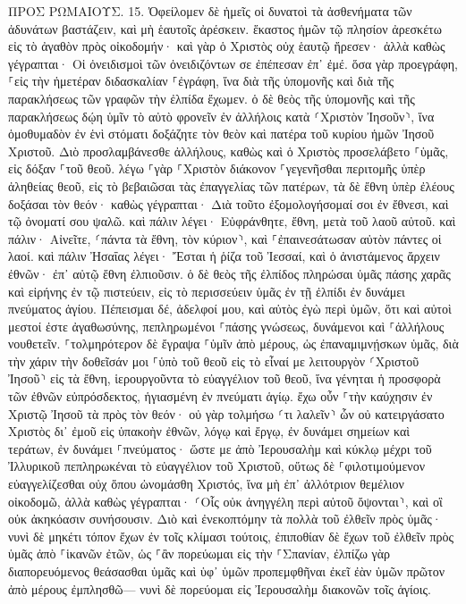 \documentclass[twoside, 9pt]{extreport}
\begin{document}
ΠΡΟΣ ΡΩΜΑΙΟΥΣ.
15.
Ὀφείλομεν δὲ ἡμεῖς οἱ δυνατοὶ τὰ ἀσθενήματα τῶν ἀδυνάτων βαστάζειν, καὶ μὴ ἑαυτοῖς ἀρέσκειν. 
ἕκαστος ἡμῶν τῷ πλησίον ἀρεσκέτω εἰς τὸ ἀγαθὸν πρὸς οἰκοδομήν· 
καὶ γὰρ ὁ Χριστὸς οὐχ ἑαυτῷ ἤρεσεν· ἀλλὰ καθὼς γέγραπται· Οἱ ὀνειδισμοὶ τῶν ὀνειδιζόντων σε ἐπέπεσαν ἐπ᾽ ἐμέ. 
ὅσα γὰρ προεγράφη, ⸀εἰς τὴν ἡμετέραν διδασκαλίαν ⸀ἐγράφη, ἵνα διὰ τῆς ὑπομονῆς καὶ διὰ τῆς παρακλήσεως τῶν γραφῶν τὴν ἐλπίδα ἔχωμεν. 
ὁ δὲ θεὸς τῆς ὑπομονῆς καὶ τῆς παρακλήσεως δῴη ὑμῖν τὸ αὐτὸ φρονεῖν ἐν ἀλλήλοις κατὰ ⸂Χριστὸν Ἰησοῦν⸃, 
ἵνα ὁμοθυμαδὸν ἐν ἑνὶ στόματι δοξάζητε τὸν θεὸν καὶ πατέρα τοῦ κυρίου ἡμῶν Ἰησοῦ Χριστοῦ. 
Διὸ προσλαμβάνεσθε ἀλλήλους, καθὼς καὶ ὁ Χριστὸς προσελάβετο ⸀ὑμᾶς, εἰς δόξαν ⸀τοῦ θεοῦ. 
λέγω ⸀γὰρ ⸀Χριστὸν διάκονον ⸀γεγενῆσθαι περιτομῆς ὑπὲρ ἀληθείας θεοῦ, εἰς τὸ βεβαιῶσαι τὰς ἐπαγγελίας τῶν πατέρων, 
τὰ δὲ ἔθνη ὑπὲρ ἐλέους δοξάσαι τὸν θεόν· καθὼς γέγραπται· Διὰ τοῦτο ἐξομολογήσομαί σοι ἐν ἔθνεσι, καὶ τῷ ὀνοματί σου ψαλῶ. 
καὶ πάλιν λέγει· Εὐφράνθητε, ἔθνη, μετὰ τοῦ λαοῦ αὐτοῦ. 
καὶ πάλιν· Αἰνεῖτε, ⸂πάντα τὰ ἔθνη, τὸν κύριον⸃, καὶ ⸀ἐπαινεσάτωσαν αὐτὸν πάντες οἱ λαοί. 
καὶ πάλιν Ἠσαΐας λέγει· Ἔσται ἡ ῥίζα τοῦ Ἰεσσαί, καὶ ὁ ἀνιστάμενος ἄρχειν ἐθνῶν· ἐπ᾽ αὐτῷ ἔθνη ἐλπιοῦσιν. 
ὁ δὲ θεὸς τῆς ἐλπίδος πληρώσαι ὑμᾶς πάσης χαρᾶς καὶ εἰρήνης ἐν τῷ πιστεύειν, εἰς τὸ περισσεύειν ὑμᾶς ἐν τῇ ἐλπίδι ἐν δυνάμει πνεύματος ἁγίου. 
Πέπεισμαι δέ, ἀδελφοί μου, καὶ αὐτὸς ἐγὼ περὶ ὑμῶν, ὅτι καὶ αὐτοὶ μεστοί ἐστε ἀγαθωσύνης, πεπληρωμένοι ⸀πάσης γνώσεως, δυνάμενοι καὶ ⸀ἀλλήλους νουθετεῖν. 
⸀τολμηρότερον δὲ ἔγραψα ⸀ὑμῖν ἀπὸ μέρους, ὡς ἐπαναμιμνῄσκων ὑμᾶς, διὰ τὴν χάριν τὴν δοθεῖσάν μοι ⸀ὑπὸ τοῦ θεοῦ 
εἰς τὸ εἶναί με λειτουργὸν ⸂Χριστοῦ Ἰησοῦ⸃ εἰς τὰ ἔθνη, ἱερουργοῦντα τὸ εὐαγγέλιον τοῦ θεοῦ, ἵνα γένηται ἡ προσφορὰ τῶν ἐθνῶν εὐπρόσδεκτος, ἡγιασμένη ἐν πνεύματι ἁγίῳ. 
ἔχω οὖν ⸀τὴν καύχησιν ἐν Χριστῷ Ἰησοῦ τὰ πρὸς τὸν θεόν· 
οὐ γὰρ τολμήσω ⸂τι λαλεῖν⸃ ὧν οὐ κατειργάσατο Χριστὸς δι᾽ ἐμοῦ εἰς ὑπακοὴν ἐθνῶν, λόγῳ καὶ ἔργῳ, 
ἐν δυνάμει σημείων καὶ τεράτων, ἐν δυνάμει ⸀πνεύματος· ὥστε με ἀπὸ Ἰερουσαλὴμ καὶ κύκλῳ μέχρι τοῦ Ἰλλυρικοῦ πεπληρωκέναι τὸ εὐαγγέλιον τοῦ Χριστοῦ, 
οὕτως δὲ ⸀φιλοτιμούμενον εὐαγγελίζεσθαι οὐχ ὅπου ὠνομάσθη Χριστός, ἵνα μὴ ἐπ᾽ ἀλλότριον θεμέλιον οἰκοδομῶ, 
ἀλλὰ καθὼς γέγραπται· ⸂Οἷς οὐκ ἀνηγγέλη περὶ αὐτοῦ ὄψονται⸃, καὶ οἳ οὐκ ἀκηκόασιν συνήσουσιν. 
Διὸ καὶ ἐνεκοπτόμην τὰ πολλὰ τοῦ ἐλθεῖν πρὸς ὑμᾶς· 
νυνὶ δὲ μηκέτι τόπον ἔχων ἐν τοῖς κλίμασι τούτοις, ἐπιποθίαν δὲ ἔχων τοῦ ἐλθεῖν πρὸς ὑμᾶς ἀπὸ ⸀ἱκανῶν ἐτῶν, 
ὡς ⸀ἂν πορεύωμαι εἰς τὴν ⸀Σπανίαν, ἐλπίζω γὰρ διαπορευόμενος θεάσασθαι ὑμᾶς καὶ ὑφ᾽ ὑμῶν προπεμφθῆναι ἐκεῖ ἐὰν ὑμῶν πρῶτον ἀπὸ μέρους ἐμπλησθῶ— 
νυνὶ δὲ πορεύομαι εἰς Ἰερουσαλὴμ διακονῶν τοῖς ἁγίοις. 
\end{document}
